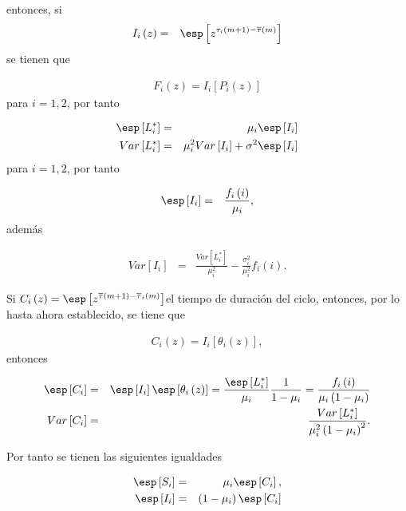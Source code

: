 entonces, si \begin{eqnarray*}I_{i}\left(z\right)&=&\esp\left[z^{\tau_{i}\left(m+1\right)-\overline{\tau}\left(m\right)}\right]\end{eqnarray*} se tienen que

\begin{eqnarray*}
F_{i}\left(z\right)=I_{i}\left[P_{i}\left(z\right)\right]
\end{eqnarray*}
para $i=1,2$, por tanto



\begin{eqnarray*}
\esp\left[L_{i}^{*}\right]&=&\mu_{i}\esp\left[I_{i}\right]\\
Var\left[L_{i}^{*}\right]&=&\mu_{i}^{2}Var\left[I_{i}\right]+\sigma^{2}\esp\left[I_{i}\right]
\end{eqnarray*}
para $i=1,2$, por tanto


\begin{eqnarray*}
\esp\left[I_{i}\right]&=&\frac{f_{i}\left(i\right)}{\mu_{i}},
\end{eqnarray*}
adem\'as

\begin{eqnarray*}
Var\left[I_{i}\right]&=&\frac{Var\left[L_{i}^{*}\right]}{\mu_{i}^{2}}-\frac{\sigma_{i}^{2}}{\mu_{i}^{2}}f_{i}\left(i\right).
\end{eqnarray*}


Si  $C_{i}\left(z\right)=\esp\left[z^{\overline{\tau}\left(m+1\right)-\overline{\tau}_{i}\left(m\right)}\right]$el tiempo de duraci\'on del ciclo, entonces, por lo hasta ahora establecido, se tiene que

\begin{eqnarray*}
C_{i}\left(z\right)=I_{i}\left[\theta_{i}\left(z\right)\right],
\end{eqnarray*}
entonces

\begin{eqnarray*}
\esp\left[C_{i}\right]&=&\esp\left[I_{i}\right]\esp\left[\theta_{i}\left(z\right)\right]=\frac{\esp\left[L_{i}^{*}\right]}{\mu_{i}}\frac{1}{1-\mu_{i}}=\frac{f_{i}\left(i\right)}{\mu_{i}\left(1-\mu_{i}\right)}\\
Var\left[C_{i}\right]&=&\frac{Var\left[L_{i}^{*}\right]}{\mu_{i}^{2}\left(1-\mu_{i}\right)^{2}}.
\end{eqnarray*}

Por tanto se tienen las siguientes igualdades


\begin{eqnarray*}
\esp\left[S_{i}\right]&=&\mu_{i}\esp\left[C_{i}\right],\\
\esp\left[I_{i}\right]&=&\left(1-\mu_{i}\right)\esp\left[C_{i}\right]\\
\end{eqnarray*}

